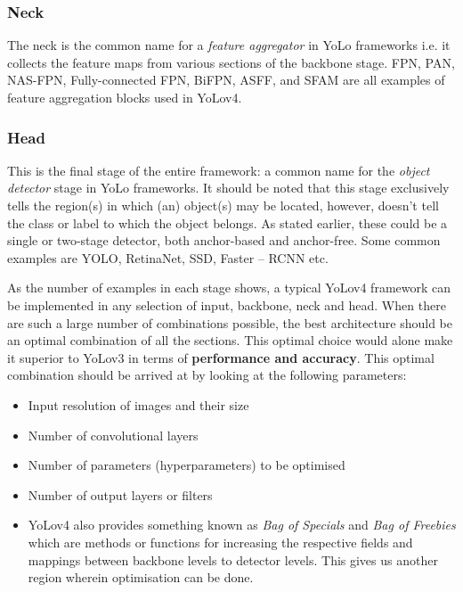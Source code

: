 \subsubsection{Neck}
The neck is the common name for a \textit{feature aggregator} in YoLo frameworks i.e. it collects the feature maps from various sections of the backbone stage. FPN, PAN, NAS-FPN, Fully-connected FPN, BiFPN, ASFF, and SFAM are all examples of feature aggregation blocks used in YoLov4.

\subsubsection{Head}
This is the final stage of the entire framework: a common name for the \textit{object detector} stage in YoLo frameworks. It should be noted that this stage exclusively tells the region(s) in which (an) object(s) may be located, however, doesn’t tell the class or label to which the object belongs. As stated earlier, these could be a single or two-stage detector, both anchor-based and anchor-free. Some common examples are YOLO, RetinaNet, SSD, Faster – RCNN etc.

As the number of examples in each stage shows, a typical YoLov4 framework can be implemented in any selection of input, backbone, neck and head. When there are such a large number of combinations possible, the best architecture should be an optimal combination of all the sections. This optimal choice would alone make it superior to YoLov3 in terms of \textbf{performance and accuracy}. This optimal combination should be arrived at by looking at the following parameters:

\begin{itemize}
\item Input resolution of images and their size
\item Number of convolutional layers
\item Number of parameters (hyperparameters) to be optimised
\item Number of output layers or filters
\item YoLov4 also provides something known as \textit{Bag of Specials} and \textit{Bag of Freebies} which are methods or functions for increasing the respective fields and mappings between backbone levels to detector levels. This gives us another region wherein optimisation can be done.

\end{itemize}

\newpage

